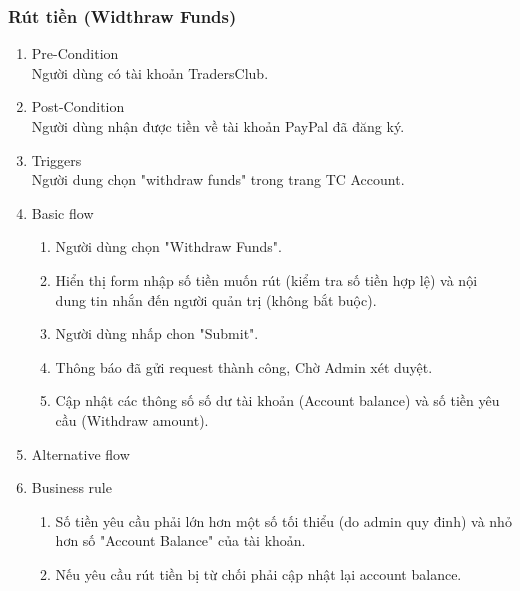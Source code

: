 \subsubsection{Rút tiền (Widthraw Funds)}
\begin{enumerate}
	\item Pre-Condition\\
	Người dùng có tài khoản TradersClub.
	\item Post-Condition\\
	Người dùng nhận được tiền về tài khoản PayPal đã đăng ký.
	\item Triggers\\
	Người dung chọn "withdraw funds" trong trang TC Account.
	\item Basic flow
	\begin{enumerate}
		\item Người dùng chọn "Withdraw Funds".
		\item Hiển thị form nhập số tiền muốn rút (kiểm tra số tiền hợp lệ) và nội dung tin nhắn đến người quản trị (không bắt buộc).
		\item Người dùng nhấp chon "Submit".
		\item Thông báo đã gửi request thành công, Chờ Admin xét duyệt. 
		\item Cập nhật các thông số số dư tài khoản (Account balance) và số tiền yêu cầu (Withdraw amount).
	\end{enumerate}
	\item Alternative flow
	\item Business rule
	\begin{enumerate}
		\item Số tiền yêu cầu phải lớn hơn một số tối thiểu (do admin quy đinh) và nhỏ hơn số "Account Balance" của tài khoản.
		\item Nếu yêu cầu rút tiền bị từ chối phải cập nhật lại account balance.
	\end{enumerate}
\end{enumerate}

